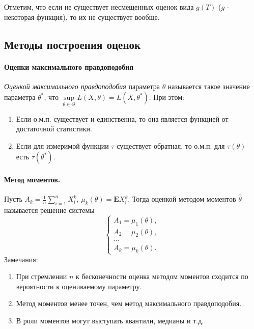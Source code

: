\documentclass[a4paper,12pt]{scrartcl}
\newcommand{\E}{\mathbf{E}}
\begin{document}
Отметим, что если не существует несмещенных оценок вида $g(T)$ ($g$ - некоторая функция), то их не существует вообще.

\subsection{Методы построения оценок}
\paragraph{Оценки максимального правдоподобия}

\emph{Оценкой максимального правдоподобия} параметра $\theta$ называется такое значение параметра $\theta^*$, что $\sup\limits_{\theta\in\Theta} L(X,\theta) = L(X,\theta^*)$. При этом:
\begin{enumerate}
 \item Если о.м.п. существует и единственна, то она является функцией от достаточной статистики.
 \item Если для измеримой функции $\tau$ существует обратная, то о.м.п. для $\tau(\theta)$ есть $\tau(\theta^*).$
\end{enumerate}
\paragraph{Метод моментов.}

Пусть $A_k = \frac{1}{n}\sum\limits_{i=1}^{n}X_i^k$, $\mu_k(\theta) = \E X_i^k$. Тогда оценкой методом моментов $\hat{\theta}$ называется решение системы
$$
\begin{cases}
A_1 = \mu_1(\theta),\\
A_2 = \mu_2(\theta),\\
...\\
A_k = \mu_k(\theta).
\end{cases}
$$
Замечания:
\begin{enumerate}
 \item При стремлении $n$ к бесконечности оценка методом моментов сходится по вероятности к оцениваемому параметру.
\item Метод моментов менее точен, чем метод максимального правдоподобия.
\item В роли моментов могут выступать квантили, медианы и т.д.
\end{enumerate}
\end{document}

